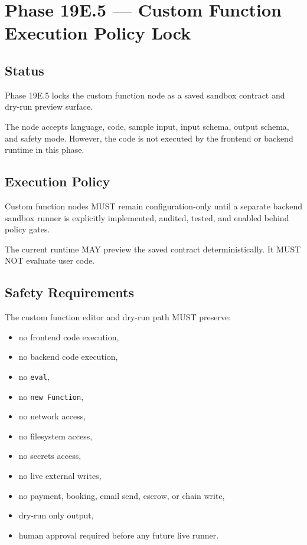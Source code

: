 \section{Phase 19E.5 --- Custom Function Execution Policy Lock}

\subsection{Status}

Phase 19E.5 locks the custom function node as a saved sandbox contract and dry-run preview surface.

The node accepts language, code, sample input, input schema, output schema, and safety mode. However, the code is not executed by the frontend or backend runtime in this phase.

\subsection{Execution Policy}

Custom function nodes MUST remain configuration-only until a separate backend sandbox runner is explicitly implemented, audited, tested, and enabled behind policy gates.

The current runtime MAY preview the saved contract deterministically. It MUST NOT evaluate user code.

\subsection{Safety Requirements}

The custom function editor and dry-run path MUST preserve:

\begin{itemize}
  \item no frontend code execution,
  \item no backend code execution,
  \item no \texttt{eval},
  \item no \texttt{new Function},
  \item no network access,
  \item no filesystem access,
  \item no secrets access,
  \item no live external writes,
  \item no payment, booking, email send, escrow, or chain write,
  \item dry-run only output,
  \item human approval required before any future live runner.
\end{itemize}

